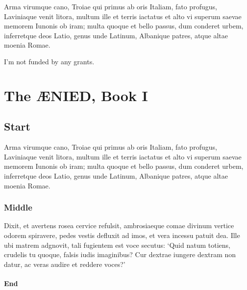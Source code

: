 \documentclass{article}
\begin{document}
\begin{acknowledgments}
  Arma virumque cano, Troiae qui primus ab oris Italiam, fato
  profugus, Laviniaque venit litora, multum ille et terris iactatus et
  alto vi superum saevae memorem Iunonis ob iram; multa quoque et
  bello passus, dum conderet urbem, inferretque deos Latio, genus unde
  Latinum, Albanique patres, atque altae moenia Romae.
\end{acknowledgments}

\begin{grantinfo}
  I'm not funded by any grants.
\end{grantinfo}







\chapter{The \AE{}NIED, Book I}\label{chap:aenied}

\section{Start}

Arma virumque cano, Troiae qui primus ab oris Italiam, fato profugus,
Laviniaque venit litora, multum ille et terris iactatus et alto vi
superum saevae memorem Iunonis ob iram; multa quoque et bello passus,
dum conderet urbem, inferretque deos Latio, genus unde Latinum,
Albanique patres, atque altae moenia Romae.\cite{virgil}

\subsection{Middle}

Dixit, et avertens rosea cervice refulsit, ambrosiaeque comae divinum
vertice odorem spiravere, pedes vestis defluxit ad imos, et vera
incessu patuit dea.  Ille ubi matrem adgnovit, tali fugientem est voce
secutus: `Quid natum totiens, crudelis tu quoque, falsis iudis
imaginibus?  Cur dextrae iungere dextram non datur, ac veras audire et
reddere voces?'\cite{virgil}

\subsubsection{End}
\end{document}
